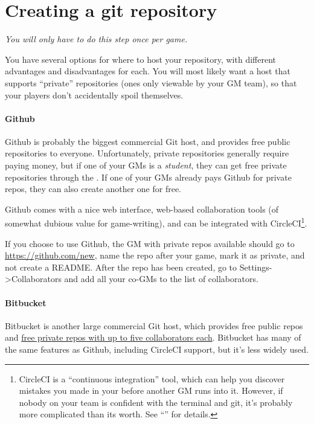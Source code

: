 \documentclass[green]{testgame}
\begin{document}
\section{Creating a git repository}

{\em You will only have to do this step once per game.}

You have several options for where to host your repository, with different advantages and disadvantages for each. You will most likely want a host that supports ``private'' repositories (ones only viewable by your GM team), so that your players don't accidentally spoil themselves.

\paragraph*{Github} Github is probably the biggest commercial Git host, and provides free public repositories to everyone. Unfortunately, private repositories generally require paying money, but if one of your GMs is a \emph{student}, they can get free private repositories through the . If one of your GMs already pays Github for private repos, they can also create another one for free.

Github comes with a nice web interface, web-based collaboration tools (of somewhat dubious value for game-writing), and can be integrated with CircleCI\footnote{CircleCI is a ``continuous integration'' tool, which can help you discover mistakes you made in your \gametex{} before another GM runs into it. However, if nobody on your team is confident with the terminal and git, it's probably more complicated than its worth. See ``\gCI{}'' for details. }.

If you choose to use Github, the GM with private repos available should go to \url{https://github.com/new}, name the repo after your game, mark it as private, and not create a README. After the repo has been created, go to Settings->Collaborators and add all your co-GMs to the list of collaborators.

\paragraph*{Bitbucket} Bitbucket is another large commercial Git host, which provides free public repos and \href{https://bitbucket.org/product/pricing/}{free private repos with up to five collaborators each}. Bitbucket has many of the same features as Github, including CircleCI support, but it's less widely used.
\end{document}
